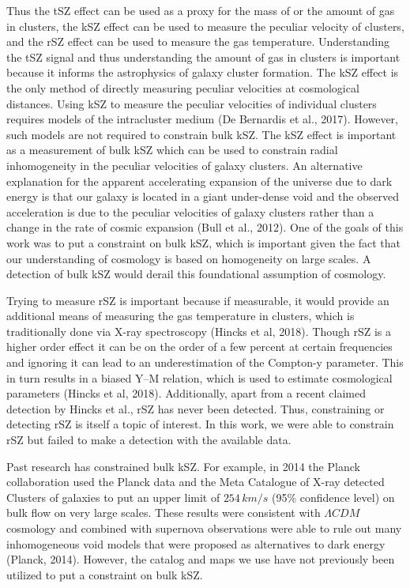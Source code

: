 \documentclass{princeton_astro_thesis}
\begin{document}
\par Thus the tSZ effect can be used as a proxy for the mass of or the amount of gas in clusters, the kSZ effect can be used to measure the peculiar velocity of clusters, and the rSZ effect can be used to measure the gas temperature. Understanding the tSZ signal and thus understanding the amount of gas in clusters is important because it informs the astrophysics of galaxy cluster formation. The kSZ effect is the only method of directly measuring peculiar velocities at cosmological distances. Using kSZ to measure the peculiar velocities of individual clusters requires models of the intracluster medium (De Bernardis et al., 2017). However, such models are not required to constrain bulk kSZ. The kSZ effect is important as a measurement of bulk kSZ which can be used to constrain radial inhomogeneity in the peculiar velocities of galaxy clusters. An alternative explanation for the apparent accelerating expansion of the universe due to dark energy is that our galaxy is located in a giant under-dense void and the observed acceleration is due to the peculiar velocities of galaxy clusters rather than a change in the rate of cosmic expansion (Bull et al., 2012). One of the goals of this work was to put a constraint on bulk kSZ, which is important given the fact that our understanding of cosmology is based on homogeneity on large scales. A detection of bulk kSZ would derail this foundational assumption of cosmology.
\par Trying to measure rSZ is important because if measurable, it would provide an additional means of measuring the gas temperature in clusters, which is traditionally done via X-ray spectroscopy (Hincks et al, 2018). Though rSZ is a higher order effect it can be on the order of a few percent at certain frequencies and ignoring it can lead to an underestimation of the Compton-y parameter. This in turn results in a biased Y--M relation, which is used to estimate cosmological parameters (Hincks et al, 2018). Additionally, apart from a recent claimed detection by Hincks et al., rSZ has never been detected. Thus, constraining or detecting rSZ is itself a topic of interest. In this work, we were able to constrain rSZ but failed to make a detection with the available data. 
\par Past research has constrained bulk kSZ. For example, in 2014 the Planck collaboration used the Planck data and the Meta Catalogue of X-ray detected Clusters of galaxies to put an upper limit of  $254\, km/s$ (95\% confidence level) on bulk flow on very large scales. These results were consistent with $\Lambda CDM$ cosmology and combined with supernova observations were able to rule out many inhomogeneous void models that were proposed as alternatives to dark energy (Planck, 2014). However, the catalog and maps we use have not previously been utilized to put a constraint on bulk kSZ. 
\end{document}
